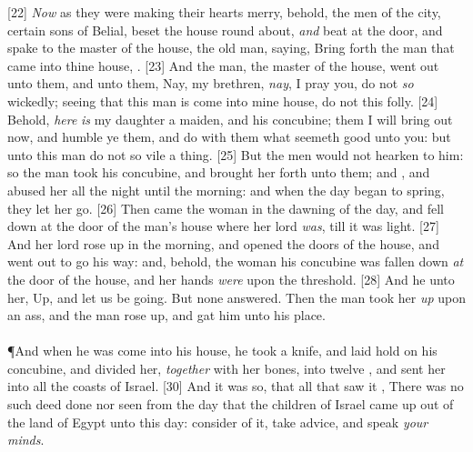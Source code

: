 [22] \textcolor[cmyk]{0.99998,1,0,0}{\emph{Now} as they were making their hearts merry, behold, the men of the city, certain sons of Belial, beset the house round about, \emph{and} beat at the door, and spake to the master of the house, the old man, saying, Bring forth the man that came into thine house, .}
[23] \textcolor[cmyk]{0.99998,1,0,0}{And the man, the master of the house, went out unto them, and   unto them, Nay, my brethren, \emph{nay}, I pray you, do not \emph{so} wickedly; seeing that this man is come into mine house, do not this folly.}
[24] \textcolor[cmyk]{0.99998,1,0,0}{Behold, \emph{here} \emph{is} my daughter a maiden, and his concubine; them I will bring out now, and humble ye them, and do with them what seemeth good unto you: but unto this man do not so vile a thing.}
[25] \textcolor[cmyk]{0.99998,1,0,0}{But the men would not hearken to him: so the man took his concubine, and brought her forth unto them; and , and abused her all the night until the morning: and when the day began to spring, they let her go.}
[26] \textcolor[cmyk]{0.99998,1,0,0}{Then came the woman in the dawning of the day, and fell down at the door of the man's house where her lord \emph{was}, till it was light.}
[27] \textcolor[cmyk]{0.99998,1,0,0}{And her lord rose up in the morning, and opened the doors of the house, and went out to go his way: and, behold, the woman his concubine was fallen down \emph{at} the door of the house, and her hands \emph{were} upon the threshold.}
[28] \textcolor[cmyk]{0.99998,1,0,0}{And he   unto her, Up, and let us be going. But none answered. Then the man took her \emph{up} upon an ass, and the man rose up, and gat him unto his place.}\\
\\
\P \textcolor[cmyk]{0.99998,1,0,0}{And when he was come into his house, he took a knife, and laid hold on his concubine, and divided her, \emph{together} with her bones, into twelve , and sent her into all the coasts of Israel.}
[30] \textcolor[cmyk]{0.99998,1,0,0}{And it was so, that all that saw it  , There was no such deed done nor seen from the day that the children of Israel came up out of the land of Egypt unto this day: consider of it, take advice, and speak \emph{your} \emph{minds}.}
